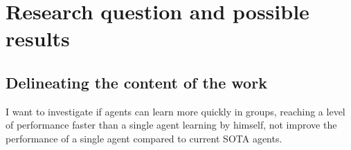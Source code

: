 \documentclass[12pt,a4paper]{article}
\begin{document}
\section{Research question and possible results}




\subsection{Delineating the content of the work}



I want to investigate if agents can learn more quickly in groups, reaching a level of performance faster than a single
agent learning by himself, not improve the performance of a single agent compared to current \ac{SOTA} agents.

\end{document}
